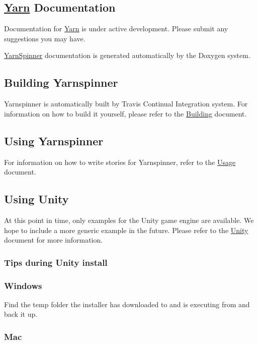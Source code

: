 \subsection*{\hyperlink{a00031}{Yarn} Documentation}

Documentation for \hyperlink{a00031}{Yarn} is under active development. Please submit any suggestions you may have.

\hyperlink{a00313}{Yarn\-Spinner} documentation is generated automatically by the Doxygen system.

\subsection*{Building Yarnspinner}

Yarnspinner is automatically built by Travis Continual Integration system. For information on how to build it yourself, please refer to the \hyperlink{a00175}{Building} document.

\subsection*{Using Yarnspinner}

For information on how to write stories for Yarnspinner, refer to the \hyperlink{a00180}{Usage} document.

\subsection*{Using Unity}

At this point in time, only examples for the Unity game engine are available. We hope to include a more generic example in the future. Please refer to the \hyperlink{a00179}{Unity} document for more information.

\subsubsection*{Tips during Unity install}

\subsubsection*{Windows}

Find the temp folder the installer has downloaded to and is executing from and back it up.

\subsubsection*{Mac}

